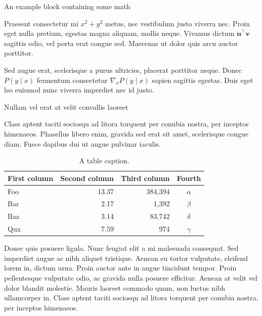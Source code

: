 \documentclass[final]{beamer}
\newlength{\colwidth}
\begin{document}
\begin{frame}[t]
\begin{columns}[t]
\begin{column}{\colwidth}
\begin{exampleblock}{An example block containing some math}{}
				
				Praesent consectetur mi $x^2 + y^2$ metus, nec vestibulum justo viverra
				nec. Proin eget nulla pretium, egestas magna aliquam, mollis neque. Vivamus
				dictum $\mathbf{u}^\intercal\mathbf{v}$ sagittis odio, vel porta erat
				congue sed. Maecenas ut dolor quis arcu auctor porttitor.
				
				
				Sed augue erat, scelerisque a purus ultricies, placerat porttitor neque.
				Donec $P(y \mid x)$ fermentum consectetur $\nabla_x P(y \mid x)$ sapien
				sagittis egestas. Duis eget leo euismod nunc viverra imperdiet nec id
				justo.
				
			\end{exampleblock}
			
			\begin{block}{Nullam vel erat at velit convallis laoreet}
				
				Class aptent taciti sociosqu ad litora torquent per conubia nostra, per
				inceptos himenaeos. Phasellus libero enim, gravida sed erat sit amet,
				scelerisque congue diam. Fusce dapibus dui ut augue pulvinar iaculis.
				
				\begin{table}
					\centering
					\begin{tabular}{l r r c}
						\toprule
						\textbf{First column} & \textbf{Second column} & \textbf{Third column} & \textbf{Fourth} \\
						\midrule
						Foo & 13.37 & 384,394 & $\alpha$ \\
						Bar & 2.17 & 1,392 & $\beta$ \\
						Baz & 3.14 & 83,742 & $\delta$ \\
						Qux & 7.59 & 974 & $\gamma$ \\
						\bottomrule
					\end{tabular}
					\caption{A table caption.}
				\end{table}
				
				Donec quis posuere ligula. Nunc feugiat elit a mi malesuada consequat. Sed
				imperdiet augue ac nibh aliquet tristique. Aenean eu tortor vulputate,
				eleifend lorem in, dictum urna. Proin auctor ante in augue tincidunt
				tempor. Proin pellentesque vulputate odio, ac gravida nulla posuere
				efficitur. Aenean at velit vel dolor blandit molestie. Mauris laoreet
				commodo quam, non luctus nibh ullamcorper in. Class aptent taciti sociosqu
				ad litora torquent per conubia nostra, per inceptos himenaeos.
				

\end{block}
\end{column}
\end{columns}
\end{frame}
\end{document}
